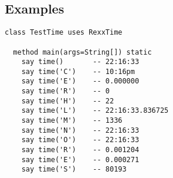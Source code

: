 \subsection{Examples}

\begin{lstlisting}[label=timeexample,caption=Example of using Time()]
  class TestTime uses RexxTime

  method main(args=String[]) static
    say time()       -- 22:16:33
    say time('C')    -- 10:16pm
    say time('E')    -- 0.000000
    say time('R')    -- 0
    say time('H')    -- 22
    say time('L')    -- 22:16:33.836725
    say time('M')    -- 1336
    say time('N')    -- 22:16:33
    say time('O')    -- 22:16:33
    say time('R')    -- 0.001204
    say time('E')    -- 0.000271
    say time('S')    -- 80193
  \end{lstlisting}

